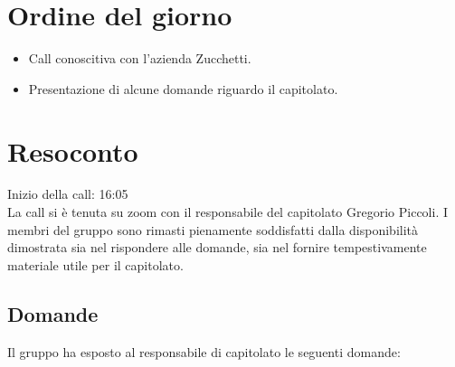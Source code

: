 \section{Ordine del giorno}

\begin{itemize}
	\item Call conoscitiva con l'azienda Zucchetti.
	\item Presentazione di alcune domande riguardo il capitolato.
\end{itemize}

\section{Resoconto}

\noindent 
Inizio della call: 16:05 \\

\noindent La call si è tenuta su zoom con il responsabile del capitolato Gregorio Piccoli. 
I membri del gruppo sono rimasti pienamente soddisfatti dalla disponibilità dimostrata sia nel rispondere alle domande, sia nel fornire tempestivamente materiale utile per il capitolato.

\subsection{Domande}

Il gruppo ha esposto al responsabile di capitolato le seguenti domande:

